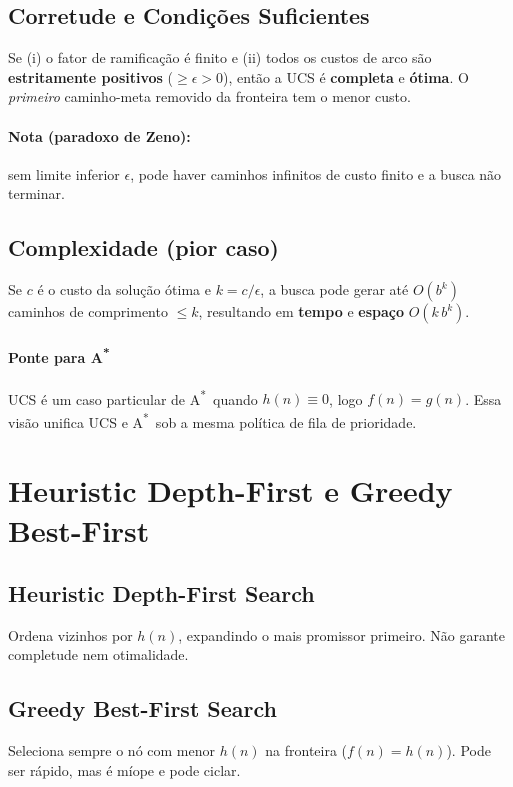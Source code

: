\documentclass[9pt,a4paper]{extarticle}
\newcommand{\Astar}{A\textsuperscript{*}}
\begin{document}
\subsection*{Corretude e Condições Suficientes}
Se (i) o fator de ramificação é finito e (ii) todos os custos de arco são \textbf{estritamente positivos} ($\ge \epsilon > 0$), então a UCS é \textbf{completa} e \textbf{ótima}.
O \emph{primeiro} caminho-meta removido da fronteira tem o menor custo.

\paragraph{Nota (paradoxo de Zeno):} sem limite inferior $\epsilon$, pode haver caminhos infinitos de custo finito e a busca não terminar.

\subsection*{Complexidade (pior caso)}
Se $c$ é o custo da solução ótima e $k=c/\epsilon$, a busca pode gerar até $O(b^{k})$ caminhos de comprimento $\le k$, resultando em \textbf{tempo} e \textbf{espaço} $O(k\,b^{k})$.

\paragraph{Ponte para \Astar}
UCS é um caso particular de \Astar\ quando $h(n)\equiv 0$, logo $f(n)=g(n)$.
Essa visão unifica UCS e \Astar\ sob a mesma política de fila de prioridade.

\section{Heuristic Depth-First e Greedy Best-First}

\subsection*{Heuristic Depth-First Search}
Ordena vizinhos por $h(n)$, expandindo o mais promissor primeiro. Não garante completude nem otimalidade.

\subsection*{Greedy Best-First Search}
Seleciona sempre o nó com menor $h(n)$ na fronteira ($f(n)=h(n)$). Pode ser rápido, mas é míope e pode ciclar.
\end{document}
